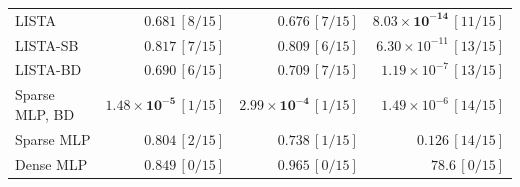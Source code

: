 \begin{table}[tbp]
\begin{minipage}[t]{0.49\textwidth}
{\begin{tabular}{@{}l rrr@{}}
\midrule
LISTA          & \(0.681\,[8/15]\)           & \(0.676\,[7/15]\)           & \(\mathbf{8.03{\times}10^{-14}}\,[11/15]\) \\
LISTA-SB       & \(0.817\,[7/15]\)           & \(0.809\,[6/15]\)           & \(6.30{\times}10^{-11}\,[13/15]\) \\
LISTA-BD       & \(0.690\,[6/15]\)           & \(0.709\,[7/15]\)           & \(1.19{\times}10^{-7}\,[13/15]\) \\
Sparse MLP, BD & \(\mathbf{1.48{\times}10^{-5}}\,[1/15]\) & \(\mathbf{2.99{\times}10^{-4}}\,[1/15]\) & \(1.49{\times}10^{-6}\,[14/15]\) \\
Sparse MLP     & \(0.804\,[2/15]\)           & \(0.738\,[1/15]\)           & \(0.126\,[14/15]\) \\
Dense MLP      & \(0.849\,[0/15]\)           & \(0.965\,[0/15]\)           & \(78.6\,[0/15]\) \\
\bottomrule
\end{tabular}
}
\end{minipage}
\end{table}
